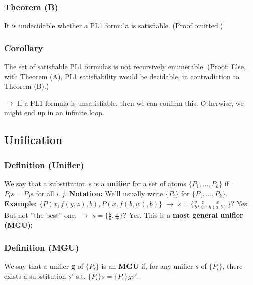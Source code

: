 \documentclass[conference]{styles/acmsiggraph}
\begin{document}
        \subsubsection{Theorem (B)}
            It is undecidable whether a PL1 formula is satisfiable. (Proof omitted.)
        
        \subsubsection{Corollary}
            The set of satisfiable PL1 formulas is not recursively enumerable. 
            (Proof: Else, with Theorem (A), PL1 satisfiability would be decidable, in contradiction to Theorem (B).)
        
        $\rightarrow$ If a PL1 formula is unsatisfiable, then we can confirm this. 
            Otherwise, we might end up in an infinite loop.
    
    
    
    
    
    
    
    
    \subsection{Unification}
        \subsubsection{Definition (Unifier)}
            We say that a substitution $s$ is a \textbf{unifier} for a set of atoms $\{P_1,...,P_k\}$ if $P_is = P_js$ for all $i,j$.\newline
            \textbf{Notation:} We'll usually write $\{P_i\}$ for $\{P_1,...,P_k\}$.\newline
            \textbf{Example:} $\{P(x,f(y,z),b),P(x,f(b,w),b)\}$\newline
                $\rightarrow$ $s = \{\frac{y}{b},\frac{z}{w},\frac{x}{h(a,b)}\}$? Yes. But not ''the best'' one.\newline
                $\rightarrow$ $s = \{\frac{y}{b},\frac{z}{w}\}$? Yes. This is a \textbf{most general unifier (MGU):}
            
        \subsubsection{Definition (MGU)}
            We say that a unifier \textbf{g} of $\{P_i\}$ is an \textbf{MGU} if, for any unifier $s$ of $\{P_i\}$, there exists a substitution $s'$ s.t. $\{P_i\}s = \{P_i\}gs'$.
        
\end{document}

